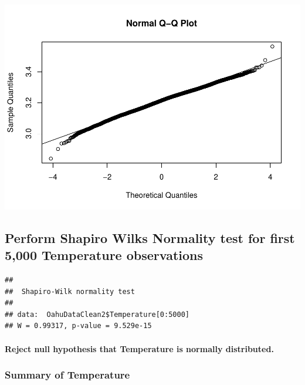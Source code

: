 \documentclass[12pt,]{article}
\newenvironment{Shaded}{\begin{snugshade}}{\end{snugshade}}
\newcommand{\KeywordTok}[1]{\textcolor[rgb]{0.13,0.29,0.53}{\textbf{#1}}}
\newcommand{\DecValTok}[1]{\textcolor[rgb]{0.00,0.00,0.81}{#1}}
\newcommand{\OperatorTok}[1]{\textcolor[rgb]{0.81,0.36,0.00}{\textbf{#1}}}
\newcommand{\NormalTok}[1]{#1}
\let\oldparagraph\paragraph
\renewcommand{\paragraph}[1]{\oldparagraph{#1}\mbox{}}
\begin{document}
\includegraphics{Garcia_ENV872_Project_files/figure-latex/unnamed-chunk-23-1.pdf}

\subsection{Perform Shapiro Wilks Normality test for first 5,000
Temperature
observations}\label{perform-shapiro-wilks-normality-test-for-first-5000-temperature-observations}

\begin{Shaded}
\end{Shaded}

\begin{verbatim}
## 
##  Shapiro-Wilk normality test
## 
## data:  OahuDataClean2$Temperature[0:5000]
## W = 0.99317, p-value = 9.529e-15
\end{verbatim}

\paragraph{Reject null hypothesis that Temperature is normally
distributed.}\label{reject-null-hypothesis-that-temperature-is-normally-distributed.}

\subsubsection{Summary of Temperature}\label{summary-of-temperature}
\end{document}
